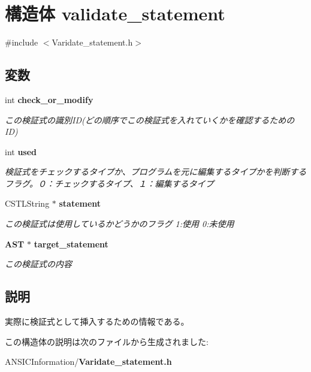 \section{構造体 validate\_\-statement}
\label{structvalidate__statement}


{\ttfamily \#include $<$Varidate\_\-statement.h$>$}

\subsection*{変数}
\begin{DoxyCompactItemize}
\item 
int {\bf check\_\-or\_\-modify}\label{structvalidate__statement_af811a34ac79801a37cfa0c5ce2f92d48}

\begin{DoxyCompactList}\small\item\em この検証式の識別ID(どの順序でこの検証式を入れていくかを確認するためのID) \item\end{DoxyCompactList}\item 
int {\bf used}\label{structvalidate__statement_ad707b113b11d4a04d6950ec7581e52f2}

\begin{DoxyCompactList}\small\item\em 検証式をチェックするタイプか、プログラムを元に編集するタイプかを判断するフラグ。０：チェックするタイプ、１：編集するタイプ \item\end{DoxyCompactList}\item 
CSTLString $\ast$ {\bf statement}\label{structvalidate__statement_a2c7d107cd83b73d65b9c6b7919b5f48e}

\begin{DoxyCompactList}\small\item\em この検証式は使用しているかどうかのフラグ 1:使用 0:未使用 \item\end{DoxyCompactList}\item 
{\bf AST} $\ast$ {\bf target\_\-statement}\label{structvalidate__statement_a97f962c68638a36d8d3ef5d52f017f84}

\begin{DoxyCompactList}\small\item\em この検証式の内容 \item\end{DoxyCompactList}\end{DoxyCompactItemize}


\subsection{説明}
実際に検証式として挿入するための情報である。 

この構造体の説明は次のファイルから生成されました:\begin{DoxyCompactItemize}
\item 
ANSICInformation/{\bf Varidate\_\-statement.h}\end{DoxyCompactItemize}
